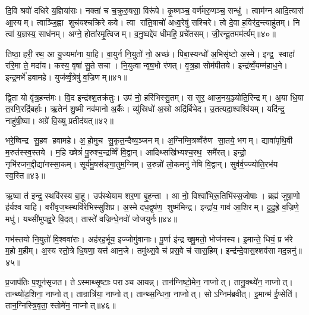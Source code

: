 दि॒वि श्रवो॑ दधिरे य॒ज्ञिया॑सः। नक्ता॑ च च॒क्रुरु॒षसा॒ विरू॑पे। कृ॒ष्णञ्च॒ वर्ण॑मरु॒णञ्च॒ सन्धु॑। त्वाम॑ग्न आदि॒त्यास॑ आ॒स्यम्। त्वाञ्जि॒ह्वा शुच॑यश्चक्रिरे कवे। त्वा रा॑ति॒षाचो॑ अध्व॒रेषु॑ सश्चिरे। त्वे दे॒वा ह॒विर॑द॒न्त्याहु॑तम्। नि त्वा॑ य॒ज्ञस्य॒ साध॑नम्। अग्ने॒ होता॑रमृ॒त्विजम्। व॒नु॒ष्वद्दे॑व धीमहि॒ प्रचे॑तसम्। जी॒रन्दू॒तमम॑र्त्यम्॥४०॥\anuvakamend[य॒ज्ञ॒वा॒ह॒सा॒स॒प॒र्य॒न्व॒यमृ॑द्ध्यां॒ भिख्ष॑माणा॒ प्रचे॑तस॒मेक॑ञ्च]

तिष्ठा॒ हरी॒ रथ॒ आ यु॒ज्यमा॑ना या॒हि। वा॒युर्न नि॒युतो॑ नो॒ अच्छ॑। पिबा॒स्यन्धो॑ अ॒भिसृ॑ष्टो अ॒स्मे। इन्द्र॒ स्वाहा॑ ररि॒मा ते॒ मदा॑य। कस्य॒ वृषा॑ सु॒ते सचा। नि॒युत्वान्वृष॒भो र॑णत्। वृ॒त्र॒हा सोम॑पीतये। इन्द्र॑व्वँ॒यम्म॑हाध॒ने। इन्द्र॒मर्भे॑ हवामहे। युज॑व्वृँ॒त्रेषु॑ व॒ज्रिणम्॥४१॥

द्वि॒ता यो वृ॑त्र॒हन्त॑मः। वि॒द इन्द्र॑श्श॒तक्र॑तुः। उप॑ नो॒ हरि॑भिस्सु॒तम्। स सूर॒ आज॒नय॒ञ्ज्योति॒रिन्द्रम्। अ॒या धि॒या त॒रणि॒रद्रि॑बर्\mbox{}हाः। ऋ॒तेन॑ शु॒ष्मी नव॑मानो अ॒र्कैः। व्यु॑स्रिधो॑ अ॒स्रो अद्रि॑र्बिभेद। उ॒तत्यदा॒श्वश्वि॑यम्। यदि॑न्द्र॒ नाहु॑षी॒ष्वा। अग्रे॑ वि॒ख्षु प्रतीद॑यत्॥४२॥

भरे॒ष्विन्द्र सु॒हव हवामहे। अ॒हो॒मुच सु॒कृत॒न्दैव्य॒ञ्जनम्। अ॒ग्निम्मि॒त्रव्वँरु॑ण सा॒तये॒ भगम्। द्यावा॑पृथि॒वी म॒रुत॑स्स्व॒स्तये। म॒हि ख्षेत्रं॑ पु॒रुश्च॒न्द्रव्विँ वि॒द्वान्। आदिथ्सखि॑भ्यश्च॒रथ॒ समै॑रत्। इन्द्रो॒ नृभि॑रजन॒द्दीद्या॑नस्सा॒कम्। सूर्य॑मु॒षस॑ङ्गा॒तुम॒ग्निम्। उ॒रुन्नो॑ लो॒कमनु॑ नेषि वि॒द्वान्। सुव॑र्व॒ज्ज्योति॒रभ॑य स्व॒स्ति॥४३॥

ऋ॒ष्वा त॑ इन्द्र॒ स्थवि॑रस्य बा॒हू। उप॑स्थेयाम शर॒णा बृ॒हन्ता। आ नो॒ विश्वा॑भिरू॒तिभि॑स्स॒जोषाः। ब्रह्म॑ जुषा॒णो ह॑र्यश्व याहि। वरी॑वृज॒थ्स्थवि॑रेभिस्सुशिप्र। अ॒स्मे दध॒द्वृष॑ण॒ शुष्म॑मिन्द्र। इन्द्रा॑य॒ गाव॑ आ॒शिरम्। दु॒दु॒ह्रे व॒ज्रिणे॒ मधु॑। यथ्सी॑मुपह्व॒रे वि॒दत्। तास्ते॑ वज्रिन्धे॒नवो॑ जोजयुर्नः॥४४॥

गभ॑स्तयो नि॒युतो॑ वि॒श्ववा॑राः। अह॑रह॒र्भूय॒ इज्जोगु॑वानाः। पू॒र्णा इ॑न्द्र ख्षु॒मतो॒ भोज॑नस्य। इ॒मान्ते॒ धियं॒ प्र भ॑रे म॒हो म॒हीम्। अ॒स्य स्तो॒त्रे धि॒षणा॒ यत्त॑ आन॒जे। तमु॑थ्स॒वे च॑ प्रस॒वे च॑ सास॒हिम्। इन्द्र॑न्दे॒वास॒श्शव॑सा मद॒न्ननु॑॥४५॥\anuvakamend[व॒ज्रिण॑मयथ्स्व॒स्ति जो॑जयुर्नस्स॒प्त च॑]

प्र॒जाप॑तिः प॒शून॑सृजत। तेऽस्माथ्सृ॒ष्टाः पराञ्च आयन्न्। तान॑ग्निष्टो॒मेन॒ नाप्नोत्। तानु॒क्थ्ये॑न॒ नाप्नोत्। तान्थ्षो॑ड॒शिना॒ नाप्नोत्। तान्रात्रि॑या॒ नाप्नोत्। तान्थ्स॒न्धिना॒ नाप्नोत्। सोऽग्निम॑ब्रवीत्। इ॒मान्म॑ ई॒प्सेति॑। तान॒ग्निस्त्रि॒वृता॒ स्तोमे॑न॒ नाप्नोत्॥४६॥

